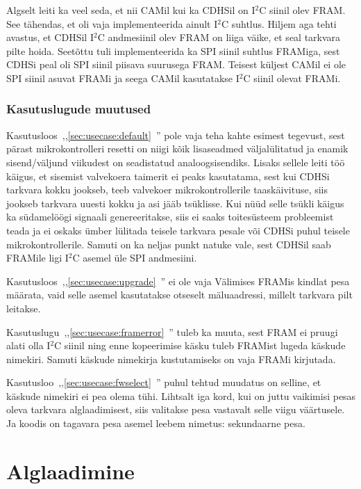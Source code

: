 \documentclass[12pt,a4paper]{article}
\newcommand{\iic}{I${}^2$C }
\begin{document}
Algselt leiti ka veel seda, et nii CAMil kui ka CDHSil on \iic siinil olev FRAM.
See tähendas, et oli vaja implementeerida ainult \iic suhtlus. Hiljem aga tehti
avastus, et CDHSil \iic andmesiinil olev FRAM on liiga väike, et seal tarkvara
pilte hoida. Seetõttu tuli implementeerida ka SPI siinil suhtlus FRAMiga, sest
CDHSi peal oli SPI siinil piisava suurusega FRAM. Teisest küljest CAMil ei ole
SPI siinil asuvat FRAMi ja seega CAMil kasutatakse \iic siinil olevat FRAMi.

\subsubsection{Kasutuslugude muutused}
Kasutusloos~,,\ref{sec:usecase:default}~'' pole vaja
teha kahte esimest tegevust, sest pärast mikrokontrolleri resetti on niigi kõik
lisaseadmed väljalülitatud ja enamik sisend/väljund viikudest on seadistatud
analoogsisendiks\cite{f1rm,f2rm}. Lisaks sellele leiti töö käigus, et sisemist
valvekoera taimerit ei peaks kasutatama, sest kui CDHSi tarkvara kokku jookseb,
teeb valvekoer mikrokontrollerile taaskäivituse, siis jookseb tarkvara uuesti
kokku ja asi jääb tsüklisse. Kui nüüd selle tsükli käigus ka südamelöögi
signaali genereeritakse, siis ei saaks toitesüsteem probleemist teada ja ei
oskaks ümber lülitada teisele tarkvara pesale või CDHSi puhul teisele
mikrokontrollerile. Samuti on ka neljas punkt natuke vale, sest CDHSil saab
FRAMile ligi \iic asemel üle SPI andmesiini.

Kasutusloos~,,\ref{sec:usecase:upgrade}~'' ei ole vaja
Välimises FRAMis kindlat pesa määrata, vaid selle asemel kasutatakse otseselt
mäluaadressi, millelt tarkvara pilt leitakse. 

Kasutuslugu~,,\ref{sec:usecase:framerror}~''
tuleb ka muuta, sest FRAM ei pruugi alati olla \iic siinil ning enne
kopeerimise käsku tuleb FRAMist lugeda käskude nimekiri. Samuti käskude
nimekirja kustutamiseks on vaja FRAMi kirjutada.

Kasutusloo~,,\ref{sec:usecase:fwselect}~'' puhul
tehtud muudatus on selline, et käskude nimekiri ei pea olema tühi. Lihtsalt iga
kord, kui on juttu vaikimisi pesas oleva tarkvara alglaadimisest, siis valitakse
pesa vastavalt selle viigu väärtusele. Ja koodis on tagavara pesa asemel leebem
nimetus: sekundaarne pesa.

\section{Alglaadimine}
\label{sec:boot}
\end{document}
